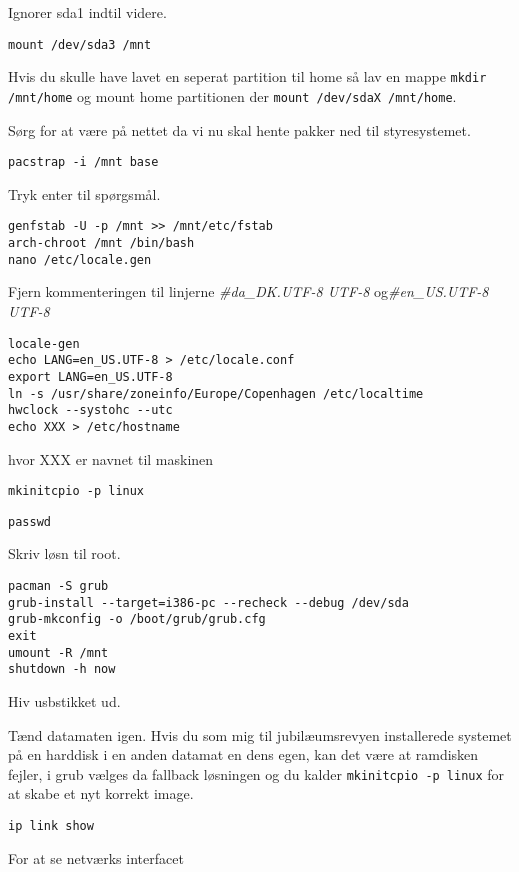 \documentclass[10pt,a4paper,danish]{article}
\newcommand{\code}[1]{\colorbox{verbgray}{\texttt{#1}}}
\begin{document}
Ignorer sda1 indtil videre.

\begin{verbatim}
mount /dev/sda3 /mnt
\end{verbatim}

Hvis du skulle have lavet en seperat partition til home så lav en mappe
\code{mkdir /mnt/home} og mount home partitionen der \code{mount /dev/sdaX
  /mnt/home}.

Sørg for at være på nettet da vi nu skal hente pakker ned til styresystemet.
\begin{verbatim}
pacstrap -i /mnt base
\end{verbatim}
Tryk enter til spørgsmål.

\begin{verbatim}
genfstab -U -p /mnt >> /mnt/etc/fstab
arch-chroot /mnt /bin/bash
nano /etc/locale.gen
\end{verbatim}

Fjern kommenteringen til linjerne \textit{\#da\_DK.UTF-8 UTF-8} og\textit{\#en\_US.UTF-8 UTF-8}

\begin{verbatim}
locale-gen
echo LANG=en_US.UTF-8 > /etc/locale.conf
export LANG=en_US.UTF-8
ln -s /usr/share/zoneinfo/Europe/Copenhagen /etc/localtime
hwclock --systohc --utc
echo XXX > /etc/hostname
\end{verbatim}
hvor XXX er navnet til maskinen

\begin{verbatim}
mkinitcpio -p linux
\end{verbatim}
\begin{verbatim}
passwd
\end{verbatim}
Skriv løsn til root.

\begin{verbatim}
pacman -S grub
grub-install --target=i386-pc --recheck --debug /dev/sda
grub-mkconfig -o /boot/grub/grub.cfg
exit
umount -R /mnt
shutdown -h now
\end{verbatim}
Hiv usbstikket ud.

Tænd datamaten igen.
Hvis du som mig til jubilæumsrevyen installerede systemet på en harddisk i en
anden datamat en dens egen, kan det være at ramdisken fejler, i grub vælges da
fallback løsningen og du kalder \code{mkinitcpio -p linux} for at skabe et nyt
korrekt image.

\begin{verbatim}
ip link show
\end{verbatim}
For at se netværks interfacet
\end{document}
